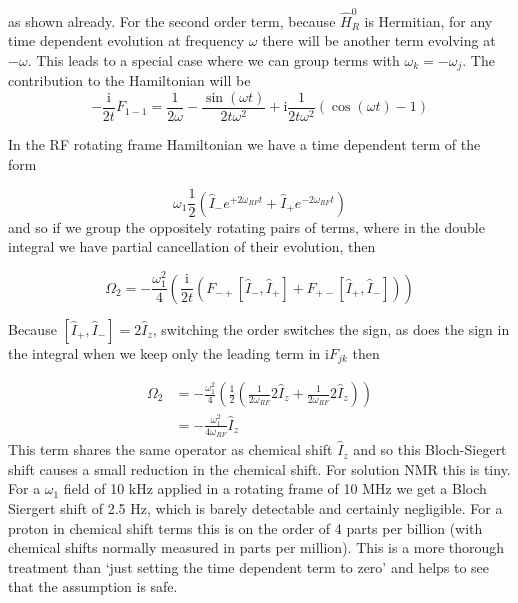 \documentclass[notitlepage,11pt]{article}
\newcommand{\rmi}{\mathrm{i}}
\begin{document}
 as shown already. For the second order term, because $\hat{H}^0_R$ is Hermitian, for any time dependent evolution at frequency $\omega$ there will be another term evolving at $-\omega$. This leads to a special case where we can group terms with $\omega_k=-\omega_j$. The contribution to the Hamiltonian will be
\begin{equation}
  -\frac{\rmi}{2t} F_{1-1}=\frac{1}{2\omega}-\frac{\sin(\omega t)}{2t\omega^2}  + \rmi\frac{1}{2t\omega^2}\left(\cos(\omega t)-1\right)
\end{equation}

In the RF rotating frame Hamiltonian we have a time dependent term of the form

\begin{equation}
  \omega_1\frac{1}{2}\left(\hat{I}_- e^{+2\omega_{RF}t}+\hat{I}_+ e^{-2\omega_{RF}t}\right)
\end{equation}
and so if we group the oppositely rotating pairs of terms, where in the double integral we have partial cancellation of their evolution, then

\begin{equation}
  \Omega_2 =-\frac{\omega_1^2}{4} \left(\frac{\rmi }{2 t} \left(F_{-+}[\hat{I}_-,\hat{I}_+] + F_{+-}[\hat{I}_+,\hat{I}_-]\right)\right)
  \end{equation}

Because $[\hat{I}_+,\hat{I}_-]=2\hat{I}_z$, switching the order switches the sign, as does the sign in the integral when we keep only the leading term in $\rmi F_{jk}$ then

\begin{equation}
  \begin{array}{rl}
    \Omega_ 2&=- \frac{\omega_1^2}{4}\left(\frac{1 }{2 } \left(\frac{1}{2\omega_{RF}} 2\hat{I}_z + \frac{1}{2\omega_{RF}} 2 \hat{I}_z\right)\right)\\
    &= -\frac{\omega_1^2}{4 \omega_{RF}}  \hat{I}_z
    \end{array}
  \end{equation}
This term shares the same operator as chemical shift $\hat{I}_z$ and so this Bloch-Siegert shift causes a small reduction in the chemical shift. For solution NMR this is tiny. For a $\omega_1$ field of 10 kHz applied in a rotating frame of 10 MHz we get a Bloch Siergert shift of 2.5 Hz, which is barely detectable and certainly negligible. For a proton in chemical shift terms this is on the order of 4 parts per billion (with chemical shifts normally measured in parts per million). This is a more thorough treatment than `just setting the time dependent term to zero' and helps to see that the assumption is safe.
\end{document}
